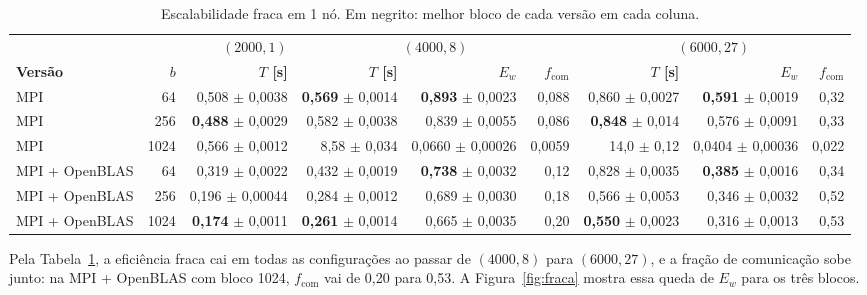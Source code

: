 \documentclass[Portugues]{ic-tese-v3}
\DeclareRobustCommand{\_}{\textunderscore\allowbreak} %
\begin{document}
\begin{table}[H]
\centering\footnotesize
\renewcommand{\arraystretch}{1.05}\setlength{\tabcolsep}{3pt}
\begin{tabular}{|l|r|r|r|r|r|r|r|r|}
\hline
 & & \textbf{$(2000,1)$} & \multicolumn{3}{c|}{\textbf{$(4000,8)$}} & \multicolumn{3}{c|}{\textbf{$(6000,27)$}} \\
\textbf{Versão} & \textbf{$b$} & \textbf{$T$ [s]} & \textbf{$T$ [s]} & \textbf{$E_w$} & \textbf{$f_{\mathrm{com}}$} & \textbf{$T$ [s]} & \textbf{$E_w$} & \textbf{$f_{\mathrm{com}}$} \\
\hline\hline
MPI & 64 & 0,508 $\pm$ 0,0038 & \textbf{0,569} $\pm$ 0,0014 & \textbf{0,893} $\pm$ 0,0023 & 0,088 & 0,860 $\pm$ 0,0027 & \textbf{0,591} $\pm$ 0,0019 & 0,32 \\ \hline
MPI & 256 & \textbf{0,488} $\pm$ 0,0029 & 0,582 $\pm$ 0,0038 & 0,839 $\pm$ 0,0055 & 0,086 & \textbf{0,848} $\pm$ 0,014 & 0,576 $\pm$ 0,0091 & 0,33 \\ \hline
MPI & 1024 & 0,566 $\pm$ 0,0012 & 8,58 $\pm$ 0,034 & 0,0660 $\pm$ 0,00026 & 0,0059 & 14,0 $\pm$ 0,12 & 0,0404 $\pm$ 0,00036 & 0,022 \\ \hline\hline
MPI + OpenBLAS & 64 & 0,319 $\pm$ 0,0022 & 0,432 $\pm$ 0,0019 & \textbf{0,738} $\pm$ 0,0032 & 0,12 & 0,828 $\pm$ 0,0035 & \textbf{0,385} $\pm$ 0,0016 & 0,34 \\ \hline
MPI + OpenBLAS & 256 & 0,196 $\pm$ 0,00044 & 0,284 $\pm$ 0,0012 & 0,689 $\pm$ 0,0030 & 0,18 & 0,566 $\pm$ 0,0053 & 0,346 $\pm$ 0,0032 & 0,52 \\ \hline
MPI + OpenBLAS & 1024 & \textbf{0,174} $\pm$ 0,0011 & \textbf{0,261} $\pm$ 0,0014 & 0,665 $\pm$ 0,0035 & 0,20 & \textbf{0,550} $\pm$ 0,0023 & 0,316 $\pm$ 0,0013 & 0,53 \\ \hline
\end{tabular}
\caption{Escalabilidade fraca em 1 nó. Em negrito: melhor bloco de cada versão em cada coluna.}
\label{tab:fraca}
\end{table}

Pela Tabela~\ref{tab:fraca}, a eficiência fraca cai em todas as configurações ao passar de $(4000,8)$ para $(6000,27)$, e a fração de comunicação sobe junto: na MPI + OpenBLAS com bloco 1024, $f_{\mathrm{com}}$ vai de 0,20 para 0,53. A Figura~\ref{fig:fraca} mostra essa queda de $E_w$ para os três blocos.
\end{document}
